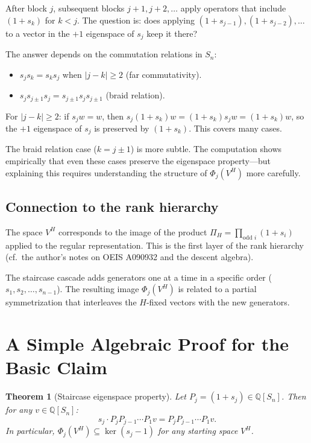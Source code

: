 \documentclass[12pt]{article}
\newtheorem{theorem}{Theorem}
\theoremstyle{definition}
\begin{document}
After block $j$, subsequent blocks $j+1, j+2, \ldots$ apply operators that include $(1+s_k)$ for $k < j$. The question is: does applying $(1+s_{j-1}), (1+s_{j-2}), \ldots$ to a vector in the $+1$ eigenspace of $s_j$ keep it there?

The answer depends on the commutation relations in $S_n$:
\begin{itemize}
  \item $s_j s_k = s_k s_j$ when $|j-k| \ge 2$ (far commutativity).
  \item $s_j s_{j\pm 1} s_j = s_{j\pm 1} s_j s_{j\pm 1}$ (braid relation).
\end{itemize}

For $|j - k| \ge 2$: if $s_j w = w$, then $s_j (1+s_k)w = (1+s_k) s_j w = (1+s_k)w$, so the $+1$ eigenspace of $s_j$ is preserved by $(1+s_k)$. This covers many cases.

The braid relation case ($k = j \pm 1$) is more subtle. The computation shows empirically that even these cases preserve the eigenspace property---but explaining this requires understanding the structure of $\Phi_j(V^H)$ more carefully.

\subsection{Connection to the rank hierarchy}

The space $V^H$ corresponds to the image of the product $\Pi_{H} = \prod_{\text{odd } i} (1+s_i)$ applied to the regular representation. This is the first layer of the rank hierarchy (cf.\ the author's notes on OEIS A090932 and the descent algebra).

The staircase cascade adds generators one at a time in a specific order ($s_1, s_2, \ldots, s_{n-1}$). The resulting image $\Phi_j(V^H)$ is related to a partial symmetrization that interleaves the $H$-fixed vectors with the new generators.

\section{A Simple Algebraic Proof for the Basic Claim}

\begin{theorem}[Staircase eigenspace property]
  Let $P_j = (1+s_j) \in \mathbb{Q}[S_n]$. Then for any $v \in \mathbb{Q}[S_n]$:
  \[
    s_j \cdot P_j P_{j-1} \cdots P_1 v = P_j P_{j-1} \cdots P_1 v.
  \]
  In particular, $\Phi_j(V^H) \subseteq \ker(s_j - 1)$ for any starting space $V^H$.
\end{theorem}
\end{document}
